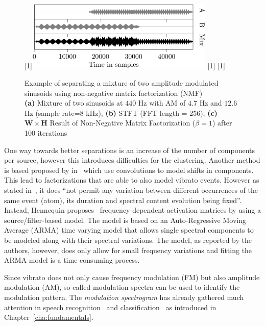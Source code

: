 \begin{figure}[h]
\centering
{}%
[1\textwidth]{\includegraphics[width=0.8\textwidth]{Chapters/05_Separation_Known/figures/Timepdf-crop.pdf}}%
\hspace{0.2\textwidth} %
[1\textwidth]{}%
\hspace{0.3\textwidth} %
[1\textwidth]{}%
\caption{Example of separating a mixture of two amplitude modulated sinusoids using non-negative matrix factorization (NMF)\\ \textbf{(a)} Mixture of two sinusoids at $440$ Hz with AM of $4.7$ Hz and $12.6$ Hz (sample rate=$8$ kHz), \textbf{(b)} STFT (FFT length = 256), \textbf{(c)} $\mathbf{W} \times \mathbf{H}$ Result of Non-Negative Matrix Factorization ($\beta = 1$) after 100 iterations}
\label{fig:am_tensor_nmf}
\end{figure}

One way towards better separations is an increase of the number of components per source, however this introduces difficulties for the clustering.
Another method is based proposed by in~\cite{smaragdis04, fitzgerald05s, jaiswal13, rodriguezserrano16} which use convolutions to model shifts in components.
This lead to factorizations that are able to also model vibrato events.
However as stated in~\cite{hennequin11}, it does ``not  permit  any variation  between  different  occurrences  of  the  same  event (atom), its duration and spectral content evolution being fixed''. 
Instead, Hennequin proposes~\cite{hennequin11} frequency-dependent activation matrices by using a source/filter-based model.
The model is based on an Auto-Regressive Moving Average (ARMA) time varying model that allows single spectral components to be modeled along with their spectral variations. 
The model, as reported by the authors, however, does only allow for small frequency variations and fitting the ARMA model is a time-consuming process.
\par
Since vibrato does not only cause frequency modulation (FM) but also amplitude modulation (AM), so-called modulation spectra can be used to identify the modulation pattern. 
The \emph{modulation spectrogram} has already gathered much attention in speech recognition~\cite{greenberg97,kingsbury98} and classification~\cite{kinnunen08, markaki09} as introduced in Chapter~\ref{cha:fundamentals}.


